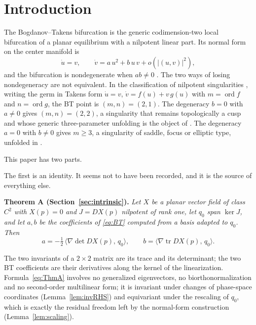 \documentclass[12pt]{article}
\theoremstyle{plain}
\theoremstyle{definition}
\theoremstyle{remark}
\newcommand{\tr}{\operatorname{tr}}
\DeclareMathOperator{\dt}{det}
\newcommand{\ip}[2]{\langle #1,\, #2\rangle}
\begin{document}
	
	\section{Introduction}\label{sec:intro}
	
	The Bogdanov--Takens bifurcation \cite{Bogdanov1975,Takens1974} is the
	generic codimension-two local bifurcation of a planar equilibrium with
	a nilpotent linear part.  Its normal form on the center manifold is
	\begin{equation}\label{eq:BT}
		\dot u = v,\qquad
		\dot v = a\,u^{2}+b\,u\,v+o(|(u,v)|^{2}),
	\end{equation}
	and the bifurcation is nondegenerate when $ab\neq0$
	\cite{Kuznetsov2004}.  The two ways of losing nondegeneracy are not
	equivalent.  In the classification of nilpotent singularities
	\cite{Dumortier1977,DLA2006}, writing the germ in Takens form
	$\dot u=v$, $\dot v=f(u)+v\,g(u)$ with $m=\operatorname{ord}f$ and
	$n=\operatorname{ord}g$, the BT point is $(m,n)=(2,1)$.  The degeneracy
	$b=0$ with $a\neq0$ gives $(m,n)=(2,2)$, a singularity that remains
	topologically a cusp and whose generic three-parameter unfolding is the
	object of \cite{DRS1987}.  The degeneracy $a=0$ with $b\neq0$ gives
	$m\geq3$, a singularity of saddle, focus or elliptic type, unfolded in
	\cite{DRSZ1991}.
	
	This paper has two parts.
	
	The first is an identity.  It seems not to have been recorded, and it
	is the source of everything else.
	
	\medskip\noindent
	\textbf{Theorem A (Section~\ref{sec:intrinsic}).}
	\emph{Let $X$ be a planar vector field of class $C^{2}$ with $X(p)=0$
		and $J=DX(p)$ nilpotent of rank one, let $q_{0}$ span $\ker J$, and let
		$a,b$ be the coefficients of \eqref{eq:BT} computed from a basis
		adapted to $q_{0}$.  Then}
	\begin{equation}\label{eq:ThmA}
		a=-\tfrac12\,\ip{\nabla\!\dt DX(p)}{q_{0}},
		\qquad
		b=\ip{\nabla\!\tr DX(p)}{q_{0}} .
	\end{equation}
	
	The two invariants of a $2\times2$ matrix are its trace and its
	determinant; the two BT coefficients are their derivatives along the
	kernel of the linearization.  Formula~\eqref{eq:ThmA} involves no
	generalized eigenvectors, no biorthonormalization and no second-order
	multilinear form; it is invariant under changes of phase-space
	coordinates (Lemma~\ref{lem:invRHS}) and equivariant under the
	rescaling of $q_{0}$, which is exactly the residual freedom left by the
	normal-form construction (Lemma~\ref{lem:scaling}).
	
\end{document}
